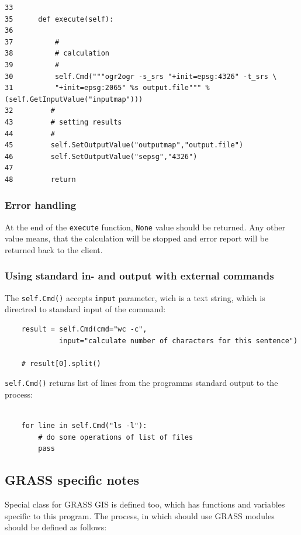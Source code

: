 \documentclass[a4paper,11pt]{article}
\begin{document}
\begin{verbatim}
33
35      def execute(self):
36          
37          #
38          # calculation
39          #
30          self.Cmd("""ogr2ogr -s_srs "+init=epsg:4326" -t_srs \
31          "+init=epsg:2065" %s output.file""" % (self.GetInputValue("inputmap")))
32         #
43         # setting results
44         #
45         self.SetOutputValue("outputmap","output.file")
46         self.SetOutputValue("sepsg","4326")
47
48         return
\end{verbatim}

\subsubsection{Error handling}
    
At the end of the \texttt{execute} function, \texttt{None} value should be returned. Any other 
value means, that the calculation will be stopped and error report will be returned back to the client.
    

\subsubsection{Using standard in- and output with external commands}
The \texttt{self.Cmd()} accepts \texttt{input} parameter, wich is a text
string, which is directred to standard input of the command:

\begin{verbatim}
    result = self.Cmd(cmd="wc -c",
             input="calculate number of characters for this sentence")

    # result[0].split()
\end{verbatim}

\texttt{self.Cmd()} returns list of lines from the programms standard
output to the process:

\begin{verbatim}

    for line in self.Cmd("ls -l"):
        # do some operations of list of files
        pass
\end{verbatim}


\subsection{GRASS specific notes}

Special class for GRASS GIS is defined too, which has functions and
variables specific to this program. The process, in which should use GRASS
modules should be defined as follows:
\end{document}
